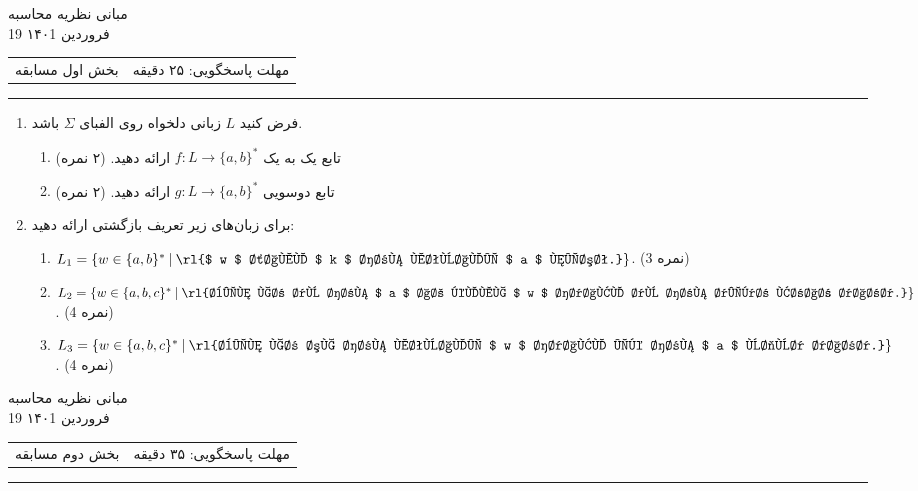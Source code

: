 \documentclass{article}
\begin{document}
	\begin{center}
		\Huge
		مبانی نظریه محاسبه
		\\
		\vspace{0.2in}
		\Large
		19 فروردین ۱۴۰1
	\end{center}
	\Large
	\begin{tabularx}{\linewidth}{>{\raggedleft\arraybackslash}X>{\raggedright\arraybackslash}X}
		بخش اول مسابقه
		&
		مهلت پاسخگویی: ۲۵ دقیقه
	\end{tabularx}
	\rule{\textwidth}{1pt}
	\begin{enumerate}
		\item 
		فرض کنید $ L $ زبانی دلخواه روی الفبای $ \Sigma $ باشد.
		\begin{enumerate}
			\item 
			 تابع یک به یک
			$f:L \rightarrow \{a,b\}^*$
			ارائه دهید. (۲ نمره)
			\item 
			 تابع دوسویی 
			$g:L \rightarrow \{a,b\}^*$
			ارائه دهید. (۲ نمره)
		\end{enumerate}
		\item
		برای زبان‌های زیر تعریف بازگشتی ارائه دهید:
		\begin{enumerate}
			\item 
			$ L_1 = \{w \in \{a,b\}^* \:|\:\text{\rl{$ w $ شامل $ k $ حرف متوالی $ a $ نیست.}}\} $.
			(3 نمره)
			\item 
			$ L_2 = \{w \in \{a,b,c\}^* \:|\:\text{\rl{بین هر دو حرف $ a $ از کلمه $ w $ حداقل دو حرف دیگر قرار دارد.}}\} $.
			(4 نمره) 
			\item 
			$ L_3 = \{w \in \{a,b,c\}^* \:|\:\text{\rl{بین هر سه حرف متوالی $ w $ حداقل یک حرف $ a $ وجود دارد.}}\} $.
			(4 نمره) 
		\end{enumerate}
	\end{enumerate}
\newpage
	\begin{center}
		\Huge
		مبانی نظریه محاسبه
		\\
		\vspace{0.2in}
		\Large
		19 فروردین ۱۴۰1
	\end{center}
	\Large
	\begin{tabularx}{\linewidth}{>{\raggedleft\arraybackslash}X>{\raggedright\arraybackslash}X}
		بخش دوم مسابقه
		&
		مهلت پاسخگویی: ۳۵ دقیقه
	\end{tabularx}
	\rule{\textwidth}{1pt}
\end{document}
